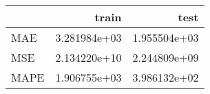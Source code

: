 \begin{tabular}{lrr}
\toprule
{} &         train &          test \\
\midrule
MAE  &  3.281984e+03 &  1.955504e+03 \\
MSE  &  2.134220e+10 &  2.244809e+09 \\
MAPE &  1.906755e+03 &  3.986132e+02 \\
\bottomrule
\end{tabular}
